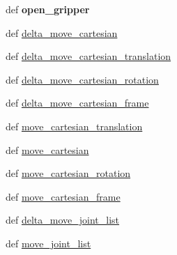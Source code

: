 \begin{DoxyCompactItemize}
\item 
\hypertarget{classrobot_1_1robot_a729f68a055e67156c3ce045cc2fd0fc2}{def {\bfseries open\-\_\-gripper}}\label{classrobot_1_1robot_a729f68a055e67156c3ce045cc2fd0fc2}

\item 
def \hyperlink{classrobot_1_1robot_a0a0558344e70e559ab0b495f8a8843ea}{delta\-\_\-move\-\_\-cartesian}
\item 
def \hyperlink{classrobot_1_1robot_a450c1237abfeac7e579a166c6c962011}{delta\-\_\-move\-\_\-cartesian\-\_\-translation}
\item 
def \hyperlink{classrobot_1_1robot_a6c58255581206c373ae32f5d36018259}{delta\-\_\-move\-\_\-cartesian\-\_\-rotation}
\item 
def \hyperlink{classrobot_1_1robot_a4798dee826a80b1d49ff6c76702eb701}{delta\-\_\-move\-\_\-cartesian\-\_\-frame}
\item 
def \hyperlink{classrobot_1_1robot_ab19b349b7b70b282e4ef9ace5a9189ab}{move\-\_\-cartesian\-\_\-translation}
\item 
def \hyperlink{classrobot_1_1robot_aba6e20a98509ff70723bd1a7bcfd946a}{move\-\_\-cartesian}
\item 
def \hyperlink{classrobot_1_1robot_a6e05c44c0b6bea15a811752544e1e5d8}{move\-\_\-cartesian\-\_\-rotation}
\item 
def \hyperlink{classrobot_1_1robot_ab38bde7945284b6108288792864f8f32}{move\-\_\-cartesian\-\_\-frame}
\item 
def \hyperlink{classrobot_1_1robot_a5bf5efcbec5d06469378276ca5e2a793}{delta\-\_\-move\-\_\-joint\-\_\-list}
\item 
def \hyperlink{classrobot_1_1robot_a812b749bc6ca437a45ffd8ec2eca7e73}{move\-\_\-joint\-\_\-list}
\end{DoxyCompactItemize}
